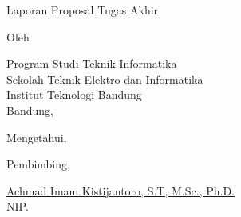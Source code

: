 \clearpage
\pagestyle{empty}

\begin{center}
  \smallskip

  \Large \bfseries \MakeUppercase{\thetitle}
  \vfill

  \Large Laporan Proposal Tugas Akhir
  \vfill

  \large Oleh

  \Large \theauthor

  \large Program Studi Teknik Informatika \\

  \normalsize \normalfont
  Sekolah Teknik Elektro dan Informatika \\
  Institut Teknologi Bandung \\

  \vfill
  \normalsize \normalfont
  Bandung, \tanggalpengesahan

  Mengetahui,

  Pembimbing,

  \vfill
  \underline{Achmad Imam Kistijantoro, S.T, M.Sc., Ph.D.
  } \\
  NIP.

\end{center}
\clearpage
